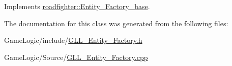 Implements \hyperlink{classroadfighter_1_1Entity__Factory__base_aa21b8cb23696844b7349ccf2c87d10fa}{roadfighter\+::\+Entity\+\_\+\+Factory\+\_\+base}.



The documentation for this class was generated from the following files\+:\begin{DoxyCompactItemize}
\item 
Game\+Logic/include/\hyperlink{GLL__Entity__Factory_8h}{G\+L\+L\+\_\+\+Entity\+\_\+\+Factory.\+h}\item 
Game\+Logic/\+Source/\hyperlink{GLL__Entity__Factory_8cpp}{G\+L\+L\+\_\+\+Entity\+\_\+\+Factory.\+cpp}\end{DoxyCompactItemize}
